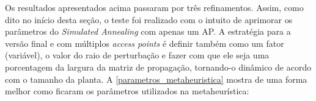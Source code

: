 \documentclass[
	12pt,				%
	twoside,			%
	a4paper,			%
	english,			%
	french,				%
	spanish,			%
	brazil				%
	]{abntex2}
\begin{document}
Os resultados apresentados acima passaram por três refinamentos. Assim,
como dito no início desta seção, o teste foi realizado com o intuito de
aprimorar os parâmetros do \emph{Simulated Annealing} com apenas um AP.
A estratégia para a versão final e com múltiplos \emph{access points} é
definir também como um fator (variável), o valor do raio de perturbação
e fazer com que ele seja uma porcentagem da largura da matriz de
propagação, tornando-o dinâmico de acordo com o tamanho da planta. A
\autoref{parametros_metaheuristica} mostra de uma forma melhor como
ficaram os parâmetros utilizados na metaheurística:

\begin{table}[]
    \centering
    \caption{Parâmetros definitivos utilizados na metaheurística}
    \label{parametros_metaheuristica}
\end{table}
\end{document}
